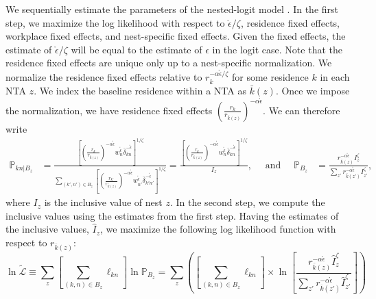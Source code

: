 \documentclass[11pt]{article}
\theoremstyle{definition}
\begin{document}
We sequentially estimate the parameters of the nested-logit model .
In the first step, we maximize the log likelihood with respect to
$\mathring{\epsilon}/\zeta$, residence fixed effects, workplace fixed effects, and
nest-specific fixed effects.
Given the fixed effects, the estimate of $\mathring{\epsilon}/\zeta$ will be equal to
the estimate of $\epsilon$ in the logit case.
Note that the residence fixed effects are unique only up to a nest-specific normalization.
We normalize the residence fixed effects relative to 
\(r_k^{-\alpha \mathring{\epsilon} / \zeta} \) for some residence $k$ in each NTA $z$.
We index the baseline residence within a NTA as \(\bar{k}(z) \).
Once we impose the normalization, we have residence fixed effects
$\left(\frac{r_k}{r_{\bar{k}(z)}}\right)^{-\alpha\mathring{\epsilon}}$.
We can therefore write
\begin{align*}
	\mathbb{P}_{kn|B_z}
	& = 
	\frac{
		\left[\left(\frac{r_k}{r_{\bar{k}(z)}}\right)^{-\alpha \mathring{\epsilon}} w_n^{\mathring{\epsilon}}\bar{\delta}_{kn}^{-\mathring{\epsilon}}  \right]^{1/\zeta}
	}{
		\sum\limits_{(k',n') \in B_z} \left[\left(\frac{r_{k'}}{r_{\bar{k}(z)}}\right)^{-\alpha \mathring{\epsilon}} w_{n'}^{\mathring{\epsilon}}\bar{\delta}_{k'n'}^{-\mathring{\epsilon}}  \right]^{1/\zeta}
	}
	=
	\frac{
		\left[\left(\frac{r_k}{r_{\bar{k}(z)}}\right)^{-\alpha \mathring{\epsilon}} w_n^{\mathring{\epsilon}}\bar{\delta}_{kn}^{-\mathring{\epsilon}}  \right]^{1/\zeta}
	}{
		I_z
    }, \quad \text{ and } \quad
	\mathbb{P}_{B_{z}} 
	& = 
	\frac{
		r_{\bar{k}(z)}^{-\alpha\mathring{\epsilon}} I_z^\zeta
	}{
		\sum_{z'} r_{\bar{k}(z')}^{-\alpha\mathring{\epsilon}} I_{z'}^\zeta
	}
	,\end{align*}
where $I_{z}$ is the inclusive value of nest $z$.
In the second step,
we compute the inclusive values using the estimates from the first step.
Having the estimates of the inclusive values, $\hat{I}_{z}$,
we maximize the following log likelihood function with respect to $r_{\bar{k}(z)}$:
\begin{equation*}
    \ln \tilde{\mathcal{L}}
    \equiv
    \sum_z \left[ \sum_{(k,n)\in B_z} \ell_{kn}\right] \ln \mathbb{P}_{B_{z}}
    = 
    \sum_z 
    \left(
    \left[ \sum_{(k,n)\in B_z} \ell_{kn}\right]
    \times
    \ln 
    \left[
      \frac{
        r_{\bar{k}(z)}^{-\alpha\mathring{\epsilon}} \hat{I}_z^\zeta
      }{
        \sum_{z'} r_{\bar{k}(z')}^{-\alpha\mathring{\epsilon}} \hat{I}_{z'}^\zeta
      }
    \right]
    \right)
\end{equation*}
\end{document}
